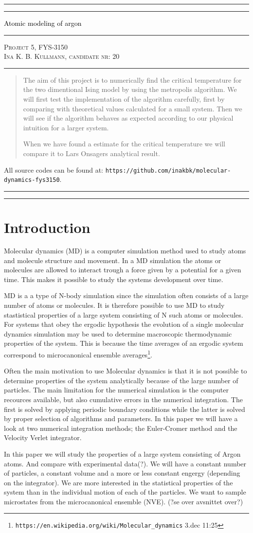 \documentclass[11pt,a4wide]{article}
\newcommand*{\titleAT}{\begingroup %
\newlength{\drop} %
\drop=0.1\textheight %

\rule{\textwidth}{1pt}\par %
\vspace{2pt}\vspace{-\baselineskip} %
\rule{\textwidth}{0.4pt}\par %

\vspace{0.5\drop} %
\centering %
\textcolor{black}{ %
{\Huge Atomic modeling of argon}\\[0.75\baselineskip] %
} 

\vspace{0.25\drop} %
\rule{0.3\textwidth}{0.4pt}\par %
\vspace{0.25\drop} %

{\Large \textsc{Project 5, FYS-3150\\[0.75\baselineskip] \normalsize{Ina K. B. Kullmann, candidate nr: 20}
}}\par %


\vspace{0.25\drop} %
\rule{0.3\textwidth}{0.4pt}\par %
\vspace{0.25\drop} %

\begin{abstract}
The aim of this project is to numerically find the critical temperature for the two dimentional Ising model by using the metropolis algorithm. We will first test the implementation of the algorithm carefully, first by comparing with theoretical values calculated for a small system. Then we will see if the algorithm behaves as expected according to our physical intuition for a larger system.

When we have found a estimate for the critical temperature we will compare it to Lars Onsagers analytical result.

\end{abstract}
\vspace*{0.25\drop} %

\begin{center}
{ \scriptsize \noindent All source codes can be found at: \texttt{https://github.com/inakbk/molecular-dynamics-fys3150}. }
\end{center}

\rule{\textwidth}{0.4pt}\par %
\vspace{2pt}\vspace{-\baselineskip} %
\rule{\textwidth}{1pt}\par %

\endgroup}
\begin{document}
\titleAT %


\newpage
\tableofcontents
\newpage

\section{Introduction}

Molecular dynamics (MD) is a computer simulation method used to study atoms and molecule structure and movement. In a MD simulation the atoms or molecules are allowed to interact trough a force given by a potential for a given time. This makes it possible to study the systems development over time. 

MD is a a type of N-body simulation since the simulation often consists of a large number of atoms or molecules. It is therefore possible to use MD to study stastistical properties of a large system consisting of N such atoms or molecules. For systems that obey the ergodic hypothesis the evolution of a single molecular dynamics simulation may be used to determine macroscopic thermodynamic properties of the system. This is because the time averages of an ergodic system correspond to microcanonical ensemble averages\footnote{\texttt{https://en.wikipedia.org/wiki/Molecular\_dynamics} 3.dec 11:25}.

Often the main motivation to use Molecular dynamics is that it is not possible to determine properties of the system analytically because of the large number of particles. The main limitation for the numerical simulation is the computer recources available, but also cumulative errors in the numerical integration. The first is solved by applying periodic boundary conditions while the latter is solved by proper selection of algorithms and parameters. In this paper we will have a look at two numerical integration methods; the Euler-Cromer method and the Velocity Verlet integrator. 


In this paper we will study the properties of a large system consisting of Argon atoms. And compare with experimental data(?). We will have a constant number of particles, a constant volume and a more or less constant engergy (depending on the integrator). We are more interested in the statistical properties of the system than in the individual motion of each of the particles. We want to sample microstates from the microcanonical ensemble (NVE).
(?se over avsnittet over?)
\end{document}
